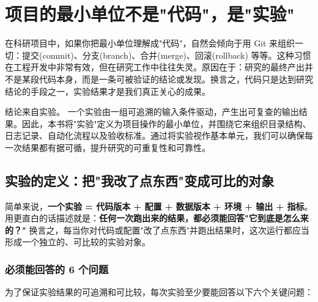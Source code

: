 \chapter{项目的最小单位不是"代码"，是"实验"}
\label{ch:experiment_unit}

在科研项目中，如果你把最小单位理解成"代码"，自然会倾向于用 Git 来组织一切：提交(commit)、分支(branch)、合并(merge)、回滚(rollback) 等等。这种习惯在工程开发中非常有效，但在研究工作中往往失灵。原因在于：研究的最终产出并不是某段代码本身，而是一条可被验证的结论或发现。换言之，代码只是达到研究结论的手段之一，实验结果才是我们真正关心的成果。

结论来自实验。 一个实验由一组可追溯的输入条件驱动，产生出可复查的输出结果。因此，本书将"实验"定义为项目操作的最小单位，并围绕它来组织目录结构、日志记录、自动化流程以及验收标准。通过将实验视作基本单元，我们可以确保每一次结果都有据可循，提升研究的可重复性和可靠性。

\section{实验的定义：把"我改了点东西"变成可比的对象}

简单来说，\textbf{一个实验 = 代码版本 + 配置 + 数据版本 + 环境 + 输出 + 指标}。用更直白的话描述就是：\textbf{任何一次跑出来的结果，都必须能回答"它到底是怎么来的？"} 换言之，每当你对代码或配置"改了点东西"并跑出结果时，这次运行都应当形成一个独立的、可比较的实验对象。

\subsection{必须能回答的 6 个问题}

为了保证实验结果的可追溯和可比较，每次实验至少要能回答以下六个关键问题：

